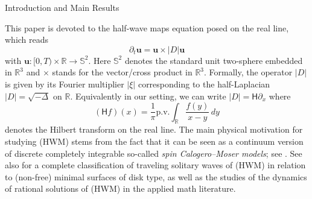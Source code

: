 \documentclass[11pt,reqno]{amsart}
\makeatletter
\theoremstyle{definition}
\theoremstyle{remark}
\theoremstyle{remark}
\numberwithin{equation}{section}
\newcommand{\C}{\mathbb{C}}
\newcommand{\R}{\mathbb{R}}
\newcommand{\Ss}{\mathbb{S}}
\newcommand{\pt}{\partial}
\newcommand{\be}{\begin{equation}}
\newcommand{\ee}{\end{equation}}
\newcommand{\Hil}{\mathsf{H}}
\newcommand{\uu}{\mathbf{u}}
\newcommand{\Gr}{\mathsf{Gr}}
\def\section{\@startsection{section}{1}%
  \z@{1.5\linespacing\@plus\linespacing}{.5\linespacing}%
  {\normalfont\bfseries\large\centering}}
\makeatother
\begin{document}
%

\tableofcontents

\section{Introduction and Main Results} \label{sec:intro}

This paper is devoted to the half-wave maps equation posed on the real line, which reads
\be \label{eq:HWM} \tag{HWM}
\pt_t \uu = \uu \times |D| \uu
\ee
with $\uu : [0,T) \times \R \to \Ss^2$. Here $\Ss^2$ denotes the standard unit two-sphere embedded in $\R^3$ and $\times$ stands for the vector/cross product in $\R^3$. Formally, the operator $|D|$ is given by its Fourier multiplier $|\xi|$ corresponding to the half-Laplacian $|D|=\sqrt{-\Delta}$ on $\R$. Equivalently in our setting, we can write $|D| = \Hil \pt_x$ where 
\be
(\Hil f)(x) = \frac{1}{\pi} \mathrm{p.v.} \int_\R \frac{f(y)}{x-y} \, dy
\ee
denotes the Hilbert transform on the real line. The main physical motivation for studying (HWM) stems from the fact that it can be seen as a continuum version of discrete completely integrable so-called {\em spin Calogero--Moser models}; see \cite{ZhSt-15, LeSo-24}. See also \cite{LeSc-18} for a complete classification of traveling solitary waves of (HWM) in relation to (non-free) minimal surfaces of disk type, as well as the studies \cite{BeKlLa-20, Ma-22} of the dynamics of rational solutions of (HWM) in the applied math literature.
\end{document}
